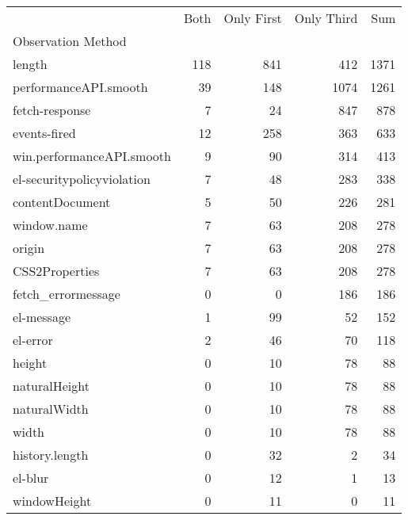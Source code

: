 \begin{tabular}{lrrrr}
 & Both & Only First & Only Third & Sum \\
Observation Method &  &  &  &  \\
length & 118 & 841 & 412 & 1371 \\
performanceAPI.smooth & 39 & 148 & 1074 & 1261 \\
fetch-response & 7 & 24 & 847 & 878 \\
events-fired & 12 & 258 & 363 & 633 \\
win.performanceAPI.smooth & 9 & 90 & 314 & 413 \\
el-securitypolicyviolation & 7 & 48 & 283 & 338 \\
contentDocument & 5 & 50 & 226 & 281 \\
window.name & 7 & 63 & 208 & 278 \\
origin & 7 & 63 & 208 & 278 \\
CSS2Properties & 7 & 63 & 208 & 278 \\
fetch_errormessage & 0 & 0 & 186 & 186 \\
el-message & 1 & 99 & 52 & 152 \\
el-error & 2 & 46 & 70 & 118 \\
height & 0 & 10 & 78 & 88 \\
naturalHeight & 0 & 10 & 78 & 88 \\
naturalWidth & 0 & 10 & 78 & 88 \\
width & 0 & 10 & 78 & 88 \\
history.length & 0 & 32 & 2 & 34 \\
el-blur & 0 & 12 & 1 & 13 \\
windowHeight & 0 & 11 & 0 & 11 \\
\end{tabular}
